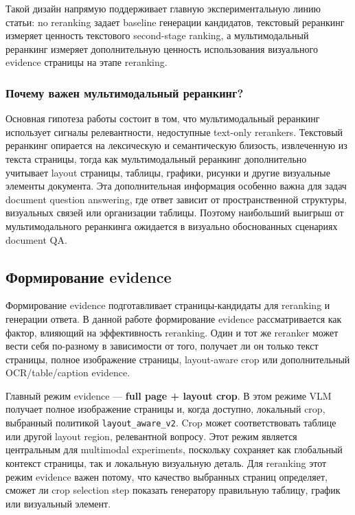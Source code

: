 \documentclass[conference]{IEEEtran}
\begin{document}
Такой дизайн напрямую поддерживает главную экспериментальную линию статьи: no reranking задает baseline генерации кандидатов, текстовый реранкинг измеряет ценность текстового second-stage ranking, а мультимодальный реранкинг измеряет дополнительную ценность использования визуального evidence страницы на этапе reranking.


\subsubsection{Почему важен мультимодальный реранкинг?}

Основная гипотеза работы состоит в том, что мультимодальный реранкинг использует сигналы релевантности, недоступные text-only rerankers. Текстовый реранкинг опирается на лексическую и семантическую близость, извлеченную из текста страницы, тогда как мультимодальный реранкинг дополнительно учитывает layout страницы, таблицы, графики, рисунки и другие визуальные элементы документа. Эта дополнительная информация особенно важна для задач document question answering, где ответ зависит от пространственной структуры, визуальных связей или организации таблицы. Поэтому наибольший выигрыш от мультимодального реранкинга ожидается в визуально обоснованных сценариях document QA.

\subsection{Формирование evidence}

Формирование evidence подготавливает страницы-кандидаты для reranking и генерации ответа. В данной работе формирование evidence рассматривается как фактор, влияющий на эффективность reranking. Один и тот же reranker может вести себя по-разному в зависимости от того, получает ли он только текст страницы, полное изображение страницы, layout-aware crop или дополнительный OCR/table/caption evidence.

Главный режим evidence --- \textbf{full page + layout crop}. В этом режиме VLM получает полное изображение страницы и, когда доступно, локальный crop, выбранный политикой \texttt{layout\_aware\_v2}. Crop может соответствовать таблице или другой layout region, релевантной вопросу. Этот режим является центральным для multimodal experiments, поскольку сохраняет как глобальный контекст страницы, так и локальную визуальную деталь. Для reranking этот режим evidence важен потому, что качество выбранных страниц определяет, сможет ли crop selection step показать генератору правильную таблицу, график или визуальный элемент.
\end{document}
